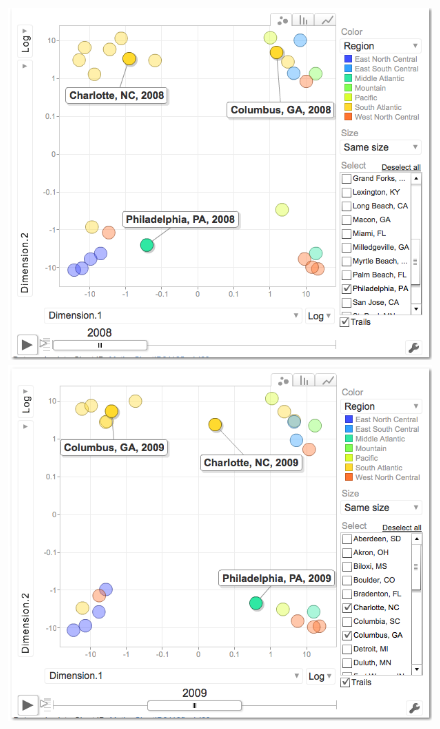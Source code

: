 \documentclass[11pt]{asaproc}
\begin{document}
\begin{figure}[h]
\begin{framed}
\begin{minipage}[b]{0.45\linewidth}
\centering
\includegraphics[width=\textwidth]{mdszscores08.png}
\end{minipage}
\hspace{0.5cm}
\begin{minipage}[b]{0.45\linewidth}
\centering
\includegraphics[width=\textwidth]{mdszscores09.png}
\end{minipage}

\end{framed}
\end{figure}
\end{document}
